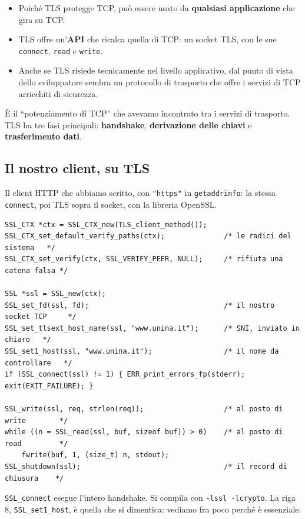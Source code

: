 \begin{itemize}
    \item Poiché TLS protegge TCP, può essere usato da \textbf{qualsiasi applicazione} che gira su TCP.
    \item TLS offre un'\textbf{API} che ricalca quella di TCP: un socket TLS, con le sue \texttt{connect}, \texttt{read} e \texttt{write}.
    \item Anche se TLS risiede tecnicamente nel livello applicativo, dal punto di vista dello sviluppatore sembra un protocollo di trasporto che offre i
          servizi di TCP arricchiti di sicurezza.
\end{itemize}

È il ``potenziamento di TCP'' che avevamo incontrato tra i servizi di trasporto. TLS ha tre fasi principali: \textbf{handshake},
\textbf{derivazione delle chiavi} e \textbf{trasferimento dati}.

\subsection{Il nostro client, su TLS}

Il client HTTP che abbiamo scritto, con \texttt{"https"} in \texttt{getaddrinfo}: la stessa \texttt{connect}, poi TLS sopra il socket,
con la libreria OpenSSL.

\begin{lstlisting}[language={[POSIX]C}, style=wnumbers, title={Un client HTTPS con OpenSSL}]
SSL_CTX *ctx = SSL_CTX_new(TLS_client_method());
SSL_CTX_set_default_verify_paths(ctx);              /* le radici del sistema   */
SSL_CTX_set_verify(ctx, SSL_VERIFY_PEER, NULL);     /* rifiuta una catena falsa */

SSL *ssl = SSL_new(ctx);
SSL_set_fd(ssl, fd);                                /* il nostro socket TCP     */
SSL_set_tlsext_host_name(ssl, "www.unina.it");      /* SNI, inviato in chiaro   */
SSL_set1_host(ssl, "www.unina.it");                 /* il nome da controllare   */
if (SSL_connect(ssl) != 1) { ERR_print_errors_fp(stderr); exit(EXIT_FAILURE); }

SSL_write(ssl, req, strlen(req));                   /* al posto di write        */
while ((n = SSL_read(ssl, buf, sizeof buf)) > 0)    /* al posto di read         */
    fwrite(buf, 1, (size_t) n, stdout);
SSL_shutdown(ssl);                                  /* il record di chiusura    */
\end{lstlisting}

\texttt{SSL\_connect} esegue l'intero handshake. Si compila con \texttt{-lssl -lcrypto}. La riga 8, \texttt{SSL\_set1\_host}, è quella che
si dimentica: vediamo fra poco perché è essenziale.

